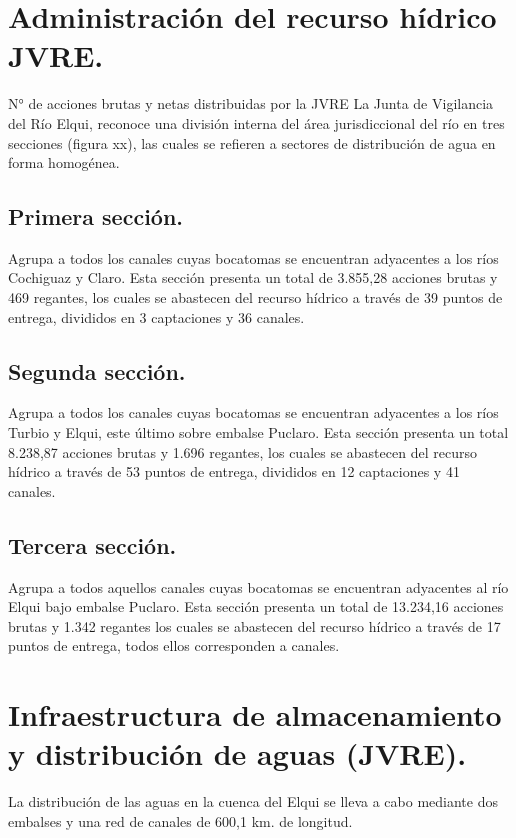 \documentclass[11pt,]{article}
\begin{document}
\section{Administración del recurso hídrico JVRE.}%

N° de acciones brutas y netas distribuidas por la JVRE
La Junta de Vigilancia del Río Elqui, reconoce una división interna del área jurisdiccional del río en tres secciones (figura xx), las cuales se refieren a sectores de distribución de agua en forma homogénea. 

\subsection{Primera sección.}
Agrupa a todos los canales cuyas bocatomas se encuentran adyacentes a los ríos Cochiguaz y Claro. Esta sección presenta un total de 3.855,28 acciones brutas y 469 regantes, los cuales se abastecen del recurso hídrico a través de 39 puntos de entrega, divididos en 3 captaciones y 36 canales.

\subsection{Segunda sección.}
Agrupa a todos los canales cuyas bocatomas se encuentran adyacentes a los ríos Turbio y Elqui, este último sobre embalse Puclaro. Esta sección presenta un total 8.238,87 acciones brutas y 1.696 regantes, los cuales se abastecen del recurso hídrico a través de 53 puntos de entrega, divididos en 12 captaciones y 41 canales.

\subsection{Tercera sección.}
Agrupa a todos aquellos canales cuyas bocatomas se encuentran adyacentes al río Elqui bajo  embalse Puclaro. Esta sección presenta un total de 13.234,16 acciones brutas y 1.342 regantes los cuales se abastecen del recurso hídrico a través de 17 puntos de entrega, todos ellos corresponden a canales.

\section{Infraestructura de almacenamiento y distribución de aguas (JVRE).}
La distribución de las aguas en la cuenca del Elqui se lleva a cabo mediante dos embalses y una red de canales de 600,1 km. de longitud.
\end{document}
